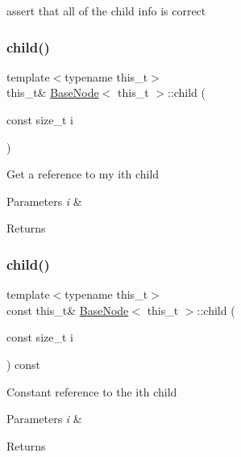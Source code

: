 assert that all of the child info is correct\mbox{\label{class_base_node_ac2ed3b362a2563e86063a157daa1c288}} 
\subsubsection{\texorpdfstring{child()}{child()}\hspace{0.1cm}{\footnotesize\ttfamily [1/2]}}
{\footnotesize\ttfamily template$<$typename this\+\_\+t$>$ \\
this\+\_\+t\& \hyperlink{class_base_node}{Base\+Node}$<$ this\+\_\+t $>$\+::child (\begin{DoxyParamCaption}\item[{const size\+\_\+t}]{i }\end{DoxyParamCaption})\hspace{0.3cm}{\ttfamily [inline]}}

Get a reference to my i\textquotesingle{}th child 
\begin{DoxyParams}{Parameters}
{\em i} & \\
\hline
\end{DoxyParams}
\begin{DoxyReturn}{Returns}

\end{DoxyReturn}
\mbox{\label{class_base_node_a2e244ddbbc0edea5f648e2a900e9dd99}} 
\subsubsection{\texorpdfstring{child()}{child()}\hspace{0.1cm}{\footnotesize\ttfamily [2/2]}}
{\footnotesize\ttfamily template$<$typename this\+\_\+t$>$ \\
const this\+\_\+t\& \hyperlink{class_base_node}{Base\+Node}$<$ this\+\_\+t $>$\+::child (\begin{DoxyParamCaption}\item[{const size\+\_\+t}]{i }\end{DoxyParamCaption}) const\hspace{0.3cm}{\ttfamily [inline]}}

Constant reference to the i\textquotesingle{}th child 
\begin{DoxyParams}{Parameters}
{\em i} & \\
\hline
\end{DoxyParams}
\begin{DoxyReturn}{Returns}

\end{DoxyReturn}
\mbox{\label{class_base_node_a4007d1c72991b8599a6ff5a21c054ba5}} 
